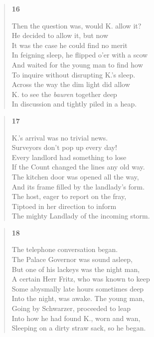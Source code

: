 \documentclass{article}
\begin{document}
\newpage
\begin{verse}
  \begin{center}
    \textbf{16} \\
  \end{center}
  Then the question was, would K. allow it? \\
  He decided to allow it, but now \\
  It was the case he could find no merit \\
  In feigning sleep, he flipped o'er with a scow \\
  And waited for the young man to find how \\
  To inquire without disrupting K.'s sleep. \\
  Across the way the dim light did allow \\
  K. to see the \textit{bauren} together deep \\
  In discussion and tightly piled in a heap.
\end{verse}
\begin{verse}
  \begin{center}
    \textbf{17} \\
  \end{center}
  K.'s arrival was no trivial news. \\
  Surveyors don't pop up every day! \\
  Every landlord had something to lose \\
  If the Count changed the lines any old way. \\
  The kitchen door was opened all the way, \\
  And its frame filled by the landlady's form. \\
  The host, eager to report on the fray, \\
  Tiptoed in her direction to inform \\
  The mighty Landlady of the incoming storm.
\end{verse}
\begin{verse}
  \begin{center}
    \textbf{18} \\
  \end{center}
  The telephone conversation began. \\
  The Palace Governor was sound asleep, \\
  But one of his lackeys was the night man, \\
  A certain Herr Fritz, who was known to keep \\
  Some abysmally late hours sometimes deep \\
  Into the night, was awake. The young man, \\
  Going by Schwarzer, proceeded to leap \\
  Into how he had found K., worn and wan, \\
  Sleeping on a dirty straw sack, so he began.
\end{verse}
\end{document}
